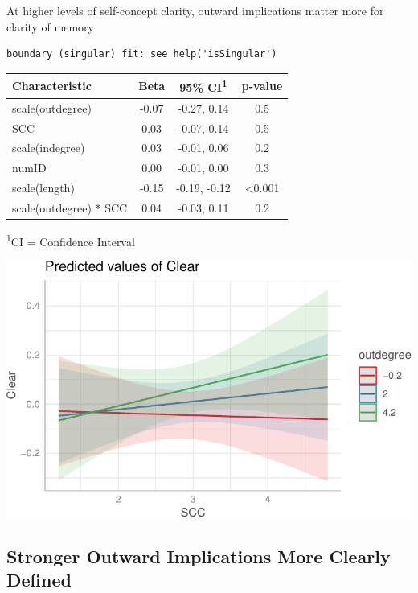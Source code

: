 \documentclass[
  .7em,
  letterpaper,
  DIV=11,
  numbers=noendperiod]{scrartcl}
\begin{document}
At higher levels of self-concept clarity, outward implications matter
more for clarity of memory

\begin{verbatim}
boundary (singular) fit: see help('isSingular')
\end{verbatim}

\captionsetup[table]{labelformat=empty,skip=1pt}
\setlength{\LTpost}{0mm}
\begin{longtable}{lccc}
\toprule
\textbf{Characteristic} & \textbf{Beta} & \textbf{95\% CI}\textsuperscript{1} & \textbf{p-value} \\ 
\midrule
scale(outdegree) & -0.07 & -0.27, 0.14 & 0.5 \\ 
SCC & 0.03 & -0.07, 0.14 & 0.5 \\ 
scale(indegree) & 0.03 & -0.01, 0.06 & 0.2 \\ 
numID & 0.00 & -0.01, 0.00 & 0.3 \\ 
scale(length) & -0.15 & -0.19, -0.12 & <0.001 \\ 
scale(outdegree) * SCC & 0.04 & -0.03, 0.11 & 0.2 \\ 
\bottomrule
\end{longtable}
\begin{minipage}{\linewidth}
\textsuperscript{1}CI = Confidence Interval\\
\end{minipage}

\includegraphics{EpMemNet_LabPres_htmldoc_files/figure-pdf/unnamed-chunk-20-1.pdf}

\hypertarget{stronger-outward-implications-more-clearly-defined}{%
\subsection{Stronger Outward Implications More Clearly
Defined}\label{stronger-outward-implications-more-clearly-defined}}
\end{document}
